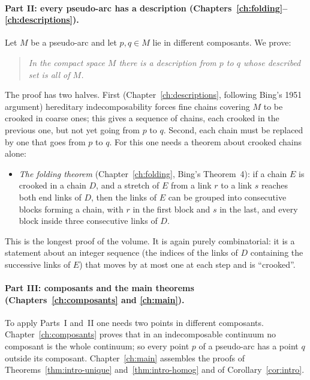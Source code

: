 \paragraph{Part II: every pseudo-arc has a description (Chapters~\ref{ch:folding}--\ref{ch:descriptions}).}
Let $M$ be a pseudo-arc and let $p,q\in M$ lie in different composants. We prove:

\begin{quote}
\emph{In the compact space $M$ there is a description from $p$ to $q$ whose described set is
all of $M$.}
\end{quote}

The proof has two halves. First (Chapter~\ref{ch:descriptions}, following Bing's 1951
argument) hereditary indecomposability forces fine chains covering $M$ to be crooked in coarse
ones; this gives a sequence of chains, each crooked in the previous one, but not yet going from
$p$ to $q$. Second, each chain must be replaced by one that goes from $p$ to $q$. For this one
needs a theorem about crooked chains alone:

\begin{itemize}
\item \emph{The folding theorem} (Chapter~\ref{ch:folding}, Bing's Theorem~4): if a chain $E$ is
crooked in a chain $D$, and a stretch of $E$ from a link $r$ to a link $s$ reaches both end links
of $D$, then the links of $E$ can be grouped into consecutive blocks forming a chain, with $r$ in
the first block and $s$ in the last, and every block inside three consecutive links of $D$.
\end{itemize}

This is the longest proof of the volume. It is again purely combinatorial: it is a statement
about an integer sequence (the indices of the links of $D$ containing the successive links of
$E$) that moves by at most one at each step and is ``crooked''.

\paragraph{Part III: composants and the main theorems (Chapters~\ref{ch:composants} and
\ref{ch:main}).}
To apply Parts~I and~II one needs two points in different composants. Chapter~\ref{ch:composants}
proves that in an indecomposable continuum no composant is the whole continuum; so every point
$p$ of a pseudo-arc has a point $q$ outside its composant. Chapter~\ref{ch:main} assembles the
proofs of Theorems~\ref{thm:intro-unique} and~\ref{thm:intro-homog} and of
Corollary~\ref{cor:intro}.

